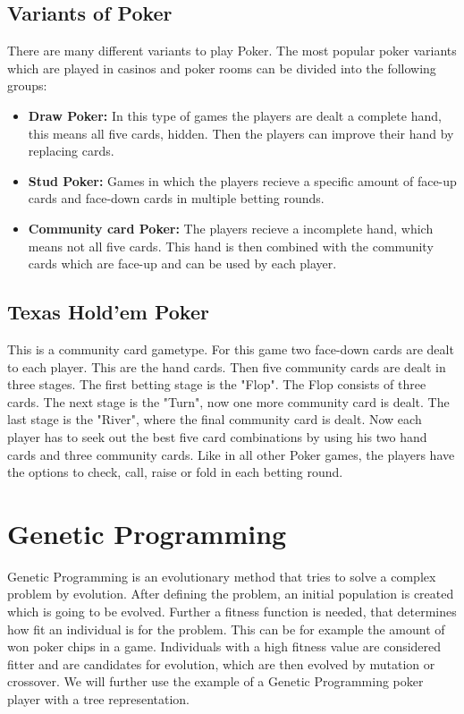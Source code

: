 \documentclass[12pt,fleqn,a4paper]{article}
\begin{document}
\subsection{Variants of Poker}
There are many different variants to play Poker. The most popular poker variants which are played in casinos and poker rooms can be divided into the following groups:
\begin{itemize}
	\item \textbf{Draw Poker:} In this type of games the players are dealt a complete hand, this means all five cards, hidden. Then the players can improve their hand by replacing cards.
	\item \textbf{Stud Poker:} Games in which the players recieve a specific amount of face-up cards and face-down cards in multiple betting rounds.
	\item \textbf{Community card Poker:} The players recieve a incomplete hand, which means not all five cards. This hand is then combined with the community cards which are face-up and can be used by each player.
\end{itemize}

\subsection{Texas Hold'em Poker}
This is a community card gametype. For this game two face-down cards are dealt to each player. This are the hand cards.
Then five community cards are dealt in three stages. The first betting stage is the "Flop". The Flop consists of three cards. The next stage is the "Turn", now one more community card is dealt. The last stage is the "River", where the final community card is dealt. Now each player has to seek out the best five card combinations by using his two hand cards and three community cards. Like in all other Poker games, the players have the options to check, call, raise or fold in each betting round.

\newpage


\section{Genetic Programming}
\label{sec:genprog}
Genetic Programming is an evolutionary method that tries to solve a complex problem by evolution.
After defining the problem, an initial population is created which is going to be evolved.
Further a fitness function is needed, that determines how fit an individual is for the problem.
This can be for example the amount of won poker chips in a game.
Individuals with a high fitness value are considered fitter and are candidates for evolution, which are then evolved by mutation or crossover.
We will further use the example of a Genetic Programming poker player with a tree representation.
\end{document}
